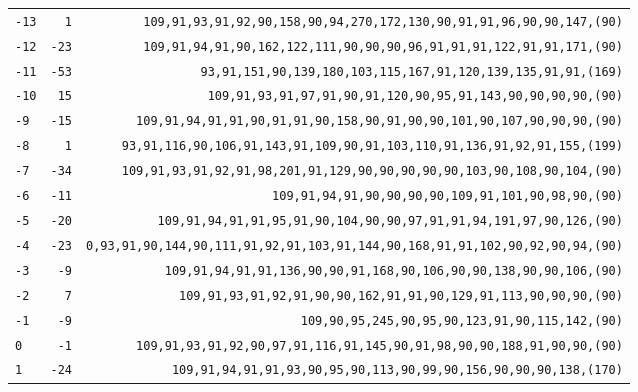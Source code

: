 \begin{table}[!phtb]
\begin{tabular}{@{\hskip 0.31cm}L@{\hskip 0.27cm}r@{\hskip 0.27cm}R@{\hskip 0.34cm}}
		\texttt{-13} & \texttt{1} & \footnotesize\texttt{109,91,93,91,92,90,158,90,94,270,172,130,90,91,91,96,90,90,147,{\color{gray}(90)}} \\
		\texttt{-12} & \texttt{-23} & \footnotesize\texttt{109,91,94,91,90,162,122,111,90,90,90,96,91,91,91,122,91,91,171,{\color{gray}(90)}} \\
		\texttt{-11} & \texttt{-53} & \footnotesize\texttt{93,91,151,90,139,180,103,115,167,91,120,139,135,91,91,{\color{gray}(169)}} \\
		\texttt{-10} & \texttt{15} & \footnotesize\texttt{109,91,93,91,97,91,90,91,120,90,95,91,143,90,90,90,90,{\color{gray}(90)}} \\
		\texttt{-9} & \texttt{-15} & \footnotesize\texttt{109,91,94,91,91,90,91,91,90,158,90,91,90,90,101,90,107,90,90,90,{\color{gray}(90)}} \\
		\texttt{-8} & \texttt{1} & \footnotesize\texttt{93,91,116,90,106,91,143,91,109,90,91,103,110,91,136,91,92,91,155,{\color{gray}(199)}} \\
		\texttt{-7} & \texttt{-34} & \footnotesize\texttt{109,91,93,91,92,91,98,201,91,129,90,90,90,90,90,103,90,108,90,104,{\color{gray}(90)}} \\
		\texttt{-6} & \texttt{-11} & \footnotesize\texttt{109,91,94,91,90,90,90,90,109,91,101,90,98,90,{\color{gray}(90)}} \\
		\texttt{-5} & \texttt{-20} & \footnotesize\texttt{109,91,94,91,91,95,91,90,104,90,90,97,91,91,94,191,97,90,126,{\color{gray}(90)}} \\
		\texttt{-4} & \texttt{-23} & \footnotesize\texttt{0,93,91,90,144,90,111,91,92,91,103,91,144,90,168,91,91,102,90,92,90,94,{\color{gray}(90)}} \\
		\texttt{-3} & \texttt{-9} & \footnotesize\texttt{109,91,94,91,91,136,90,90,91,168,90,106,90,90,138,90,90,106,{\color{gray}(90)}} \\
		\texttt{-2} & \texttt{7} & \footnotesize\texttt{109,91,93,91,92,91,90,90,162,91,91,90,129,91,113,90,90,90,{\color{gray}(90)}} \\
		\texttt{-1} & \texttt{-9} & \footnotesize\texttt{109,90,95,245,90,95,90,123,91,90,115,142,{\color{gray}(90)}} \\\midrule
		\texttt{0} & \texttt{-1} & \scriptsize\texttt{109,91,93,91,92,90,97,91,116,91,145,90,91,98,90,90,188,91,90,90,{\color{gray}(90)}} \\\midrule
		\texttt{1} & \texttt{-24} & \scriptsize\texttt{109,91,94,91,91,93,90,95,90,113,90,99,90,156,90,90,90,138,{\color{gray}(170)}} \\

\end{tabular}
\end{table}
